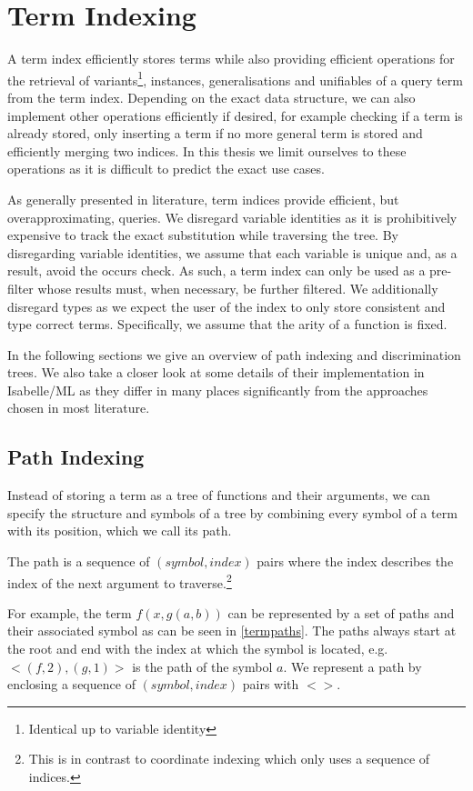 \chapter{Term Indexing}

A term index efficiently stores terms while also providing efficient operations for the retrieval of variants\footnote{Identical up to variable identity}, instances, generalisations and unifiables of a query term from the term index. Depending on the exact data structure, we can also implement other operations efficiently if desired, for example checking if a term is already stored, only inserting a term if no more general term is stored and efficiently merging two indices. In this thesis we limit ourselves to these operations as it is difficult to predict the exact use cases.

As generally presented in literature, term indices provide efficient, but overapproximating, queries. We disregard variable identities as it is prohibitively expensive to track the exact substitution while traversing the tree. By disregarding variable identities, we assume that each variable is unique and, as a result, avoid the occurs check. As such, a term index can only be used as a pre-filter whose results must, when necessary, be further filtered. We additionally disregard types as we expect the user of the index to only store consistent and type correct terms. Specifically, we assume that the arity of a function is fixed.

In the following sections we give an overview of path indexing and discrimination trees. We also take a closer look at some details of their implementation in Isabelle/ML as they differ in many places significantly from the approaches chosen in most literature.

\section{Path Indexing}
Instead of storing a term as a tree of functions and their arguments, we can specify the structure and symbols of a tree by combining every symbol of a term with its position, which we call its path.
\begin{defn}
  The path is a sequence of $(symbol, index)$ pairs where the index describes the index of the next argument to traverse.\footnote{This is in contrast to coordinate indexing which only uses a sequence of indices.}
\end{defn}
For example, the term $f(x,g(a,b))$ can be represented by a set of paths and their associated symbol as can be seen in \cref{termpaths}.
The paths always start at the root and end with the index at which the symbol is located, e.g. $<(f,2), (g,1)>$ is the path of the symbol $a$. We represent a path by enclosing a sequence of $(symbol, index)$ pairs with $<>$.

